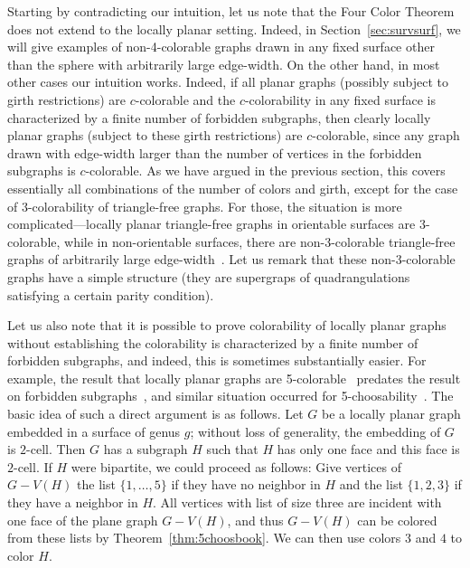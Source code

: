 \documentclass[12pt,twoside,openright,a4paper]{book}
\begin{document}
Starting by contradicting our intuition, let us note that the Four Color Theorem does not extend to the locally planar setting.
Indeed, in Section~\ref{sec:survsurf}, we will give examples of non-4-colorable graphs drawn in any fixed surface other than the sphere
with arbitrarily large edge-width.  On the other hand, in most other cases our intuition works.  Indeed, if all planar graphs (possibly subject
to girth restrictions) are $c$-colorable and the $c$-colorability in any fixed surface is characterized by a finite number of forbidden subgraphs, then clearly
locally planar graphs (subject to these girth restrictions) are $c$-colorable, since any graph drawn with edge-width larger than the number of vertices in
the forbidden subgraphs is $c$-colorable.  As we have argued in the previous section, this covers essentially all combinations of the number of colors
and girth, except for the case of $3$-colorability of triangle-free graphs.  For those, the situation is more complicated---locally planar triangle-free
graphs in orientable surfaces are 3-colorable, while in non-orientable surfaces, there are non-3-colorable triangle-free graphs of arbitrarily large edge-width~\cite{trfree6}.
Let us remark that these non-3-colorable graphs have a simple structure (they are supergraps of quadrangulations satisfying a certain parity condition).

Let us also note that it is possible to prove colorability of locally planar graphs without establishing the colorability is characterized
by a finite number of forbidden subgraphs, and indeed, this is sometimes substantially easier.
For example, the result that locally planar graphs are 5-colorable~\cite{Th2} predates the result on forbidden subgraphs~\cite{Thomassen97},
and similar situation occurred for 5-choosability~\cite{DKM,lukethe}.  The basic idea of such a direct argument is as follows.
Let $G$ be a locally planar graph embedded in a surface of genus $g$; without loss of generality, the embedding of $G$ is $2$-cell.
Then $G$ has a subgraph $H$ such that $H$ has only one face and this face is $2$-cell.
If $H$ were bipartite, we could proceed as follows: Give vertices of $G-V(H)$ the list $\{1,\ldots,5\}$ if they have no
neighbor in $H$ and the list $\{1,2,3\}$ if they have a neighbor in $H$. All vertices with list of size three are
incident with one face of the plane graph $G-V(H)$, and thus $G-V(H)$ can be colored from these lists by Theorem~\ref{thm:5choosbook}.
We can then use colors $3$ and $4$ to color $H$.
\end{document}
